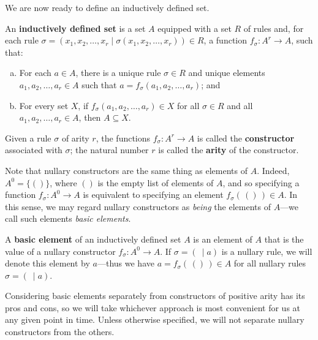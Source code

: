 We are now ready to define an inductively defined set.

\begin{definition}
\label{defInductivelyDefinedSet}
An \textbf{inductively defined set} is a set $A$ equipped with a set $R$ of rules and, for each rule $\sigma = (x_1,x_2,\dots,x_r \mid \sigma(x_1,x_2,\dots,x_r)) \in R$, a function $f_{\sigma} : A^r \to A$, such that:
\begin{enumerate}[(a)]
\item For each $a \in A$, there is a unique rule $\sigma \in R$ and unique elements $a_1,a_2,\dots,a_r \in A$ such that $a = f_{\sigma}(a_1,a_2,\dots,a_r)$; and
\item For every set $X$, if $f_{\sigma}(a_1,a_2,\dots,a_r) \in X$ for all $\sigma \in R$ and all $a_1,a_2,\dots,a_r \in A$, then $A \subseteq X$.
\end{enumerate}
Given a rule $\sigma$ of arity $r$, the functions $f_{\sigma} : A^r \to A$ is called the \textbf{constructor} associated with $\sigma$; the natural number $r$ is called the \textbf{arity} of the constructor.
\end{definition}

Note that nullary constructors are the same thing as elements of $A$. Indeed, $A^0 = \{ () \}$, where $()$ is the empty list of elements of $A$, and so specifying a function $f_{\sigma} : A^0 \to A$ is equivalent to specifying an element $f_{\sigma}(\,()\,) \in A$. In this sense, we may regard nullary constructors as \textit{being} the elements of $A$---we call such elements \textit{basic elements}.

\begin{definition}
\label{defBasicElement}
A \textbf{basic element} of an inductively defined set $A$ is an element of $A$ that is the value of a nullary constructor $f_{\sigma} : A^0 \to A$. If $\sigma = (~ \mid a)$ is a nullary rule, we will denote this element by $a$---thus we have $a = f_{\sigma}(\,()\,) \in A$ for all nullary rules $\sigma = (~ \mid a)$.
\end{definition}

Considering basic elements separately from constructors of positive arity has its pros and cons, so we will take whichever approach is most convenient for us at any given point in time. Unless otherwise specified, we will not separate nullary constructors from the others.

